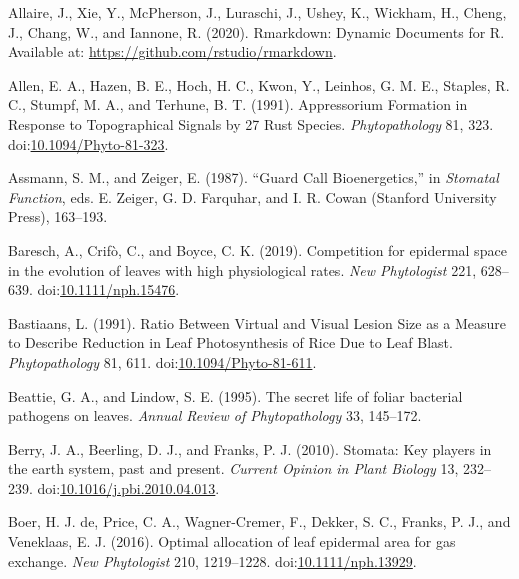 \documentclass[utf8]{frontiersSCNS}
\newlength{\cslhangindent}
\newenvironment{cslreferences}%
  {\setlength{\parindent}{0pt}%
  \everypar{\setlength{\hangindent}{\cslhangindent}}\ignorespaces}%
  {\par}
\begin{document}
\hypertarget{refs}{}
\begin{cslreferences}
\leavevmode\hypertarget{ref-allaire_rmarkdown:_2020}{}%
Allaire, J., Xie, Y., McPherson, J., Luraschi, J., Ushey, K., Wickham,
H., Cheng, J., Chang, W., and Iannone, R. (2020). Rmarkdown: Dynamic
Documents for R. Available at:
\url{https://github.com/rstudio/rmarkdown}.

\leavevmode\hypertarget{ref-allen_appressorium_1991}{}%
Allen, E. A., Hazen, B. E., Hoch, H. C., Kwon, Y., Leinhos, G. M. E.,
Staples, R. C., Stumpf, M. A., and Terhune, B. T. (1991). Appressorium
Formation in Response to Topographical Signals by 27 Rust Species.
\emph{Phytopathology} 81, 323.
doi:\href{https://doi.org/10.1094/Phyto-81-323}{10.1094/Phyto-81-323}.

\leavevmode\hypertarget{ref-assmann_guard_1987}{}%
Assmann, S. M., and Zeiger, E. (1987). ``Guard Call Bioenergetics,'' in
\emph{Stomatal Function}, eds. E. Zeiger, G. D. Farquhar, and I. R.
Cowan (Stanford University Press), 163--193.

\leavevmode\hypertarget{ref-baresch_competition_2019}{}%
Baresch, A., Crifò, C., and Boyce, C. K. (2019). Competition for
epidermal space in the evolution of leaves with high physiological
rates. \emph{New Phytologist} 221, 628--639.
doi:\href{https://doi.org/10.1111/nph.15476}{10.1111/nph.15476}.

\leavevmode\hypertarget{ref-bastiaans_ratio_1991}{}%
Bastiaans, L. (1991). Ratio Between Virtual and Visual Lesion Size as a
Measure to Describe Reduction in Leaf Photosynthesis of Rice Due to Leaf
Blast. \emph{Phytopathology} 81, 611.
doi:\href{https://doi.org/10.1094/Phyto-81-611}{10.1094/Phyto-81-611}.

\leavevmode\hypertarget{ref-beattie_secret_1995}{}%
Beattie, G. A., and Lindow, S. E. (1995). The secret life of foliar
bacterial pathogens on leaves. \emph{Annual Review of Phytopathology}
33, 145--172.

\leavevmode\hypertarget{ref-berry_stomata:_2010}{}%
Berry, J. A., Beerling, D. J., and Franks, P. J. (2010). Stomata: Key
players in the earth system, past and present. \emph{Current Opinion in
Plant Biology} 13, 232--239.
doi:\href{https://doi.org/10.1016/j.pbi.2010.04.013}{10.1016/j.pbi.2010.04.013}.

\leavevmode\hypertarget{ref-de_boer_optimal_2016}{}%
Boer, H. J. de, Price, C. A., Wagner-Cremer, F., Dekker, S. C., Franks,
P. J., and Veneklaas, E. J. (2016). Optimal allocation of leaf epidermal
area for gas exchange. \emph{New Phytologist} 210, 1219--1228.
doi:\href{https://doi.org/10.1111/nph.13929}{10.1111/nph.13929}.


\end{cslreferences}
\end{document}

